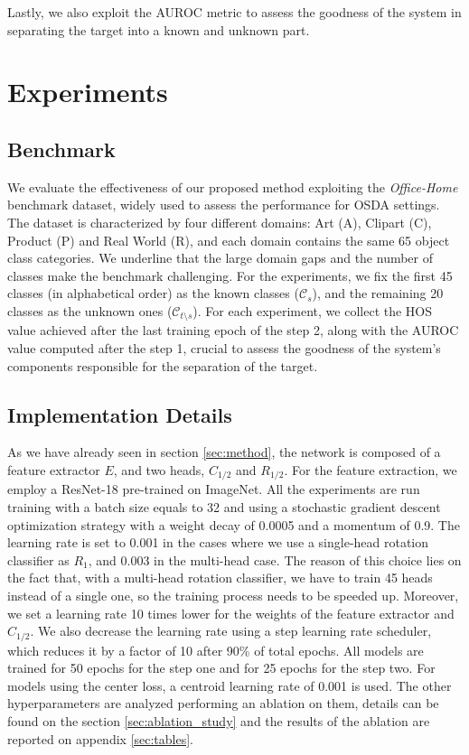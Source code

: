 \documentclass[10pt,twocolumn,letterpaper]{article}
\begin{document}
Lastly, we also exploit the AUROC metric to assess the goodness of the system in separating
the target into a known and unknown part.

\section{Experiments}
\label{sec:experiments}

\subsection{Benchmark}
\label{sec:dataset}

We evaluate the effectiveness of our proposed method exploiting the {\it Office-Home} \cite{OfficeHomeDataset} benchmark dataset,
widely used to assess the performance for OSDA settings.
The dataset is characterized by four different domains: Art (A), Clipart (C), Product (P) and Real World (R), and
each domain contains the same 65 object class categories.
We underline that the large domain gaps and the number of classes make the benchmark challenging.
For the experiments, we fix the first 45 classes (in alphabetical order) as the known classes ($\mathcal{C}_s$),
and the remaining 20 classes as the unknown ones ($\mathcal{C}_{t \setminus s}$).
For each experiment, we collect the HOS value achieved after the last training epoch of the step 2,
along with the AUROC value computed after the step 1, crucial to assess the goodness
of the system's components responsible for the separation of the target.

\subsection{Implementation Details}
\label{sec:implementation_details}

As we have already seen in section \ref{sec:method}, the network is composed of a feature extractor $E$, and two heads, $C_{1/2}$ and $R_{1/2}$.
For the feature extraction, we employ a ResNet-18\cite{ResNet18} pre-trained on ImageNet.
All the experiments are run training with a batch size equals to 32 and using a stochastic gradient descent optimization strategy
with a weight decay of 0.0005 and a momentum of 0.9.
The learning rate is set to 0.001 in the cases where we use a single-head rotation classifier as $R_1$, and 0.003 in the multi-head case.
The reason of this choice lies on the fact that, with a multi-head rotation classifier, we have to train 45 heads instead of a single one,
so the training process needs to be speeded up.
Moreover, we set a learning rate 10 times lower for the weights of the feature extractor and $C_{1/2}$.
We also decrease the learning rate using a step learning rate scheduler, which reduces it by a factor of 10 after 90\% of total epochs.
All models are trained for 50 epochs for the step one and for 25 epochs for the step two.
For models using the center loss, a centroid learning rate of 0.001 is used.
The other hyperparameters are analyzed performing an ablation on them,
details can be found on the section \ref{sec:ablation_study} and the results of the ablation are
reported on appendix \ref{sec:tables}.
\end{document}
